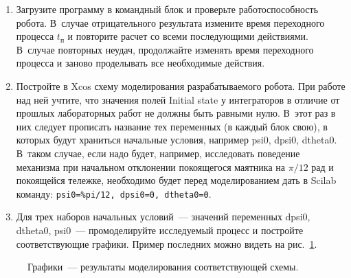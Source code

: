\documentclass[12pt,a4paper,openany]{extarticle}
\begin{document}
\begin{enumerate}
	\item Загрузите программу в командный блок и проверьте работоспособность робота.
	В~случае отрицательного результата измените время переходного процесса $t_\text{п}$ и повторите расчет со всеми последующими действиями.
	В~случае повторных неудач, продолжайте изменять время переходного процесса и заново проделывать все необходимые действия.
	\item Постройте в Xcos схему моделирования разрабатываемого робота. При работе над ней учтите, что значения полей Initial state у интеграторов в отличие от прошлых лабораторных работ не должны быть равными нулю. В~этот раз в них следует прописать название тех переменных (в каждый блок свою), в которых будут храниться начальные условия, например psi0, dpsi0, dtheta0. В~таком случае, если надо будет, например, исследовать поведение механизма при начальном отклонении покоящегося маятника на $\pi/12 \text{ рад}$ и покоящейся тележке, необходимо будет перед моделированием дать в Scilab команду: \verb|psi0=%pi/12, dpsi0=0, dtheta0=0|.
	\item Для трех наборов начальных условий~--- значений переменных dpsi0, dtheta0, psi0~--- промоделируйте исследуемый процесс и постройте соответствующие графики. Пример последних можно видеть на рис.~\ref{fig:graphics_from_model}.
\end{enumerate}

\begin{figure}[p]
	\noindent{}
	\caption{Графики~--- результаты моделирования соответствующей схемы.}
	\label{fig:graphics_from_model}
\end{figure}
\end{document}

